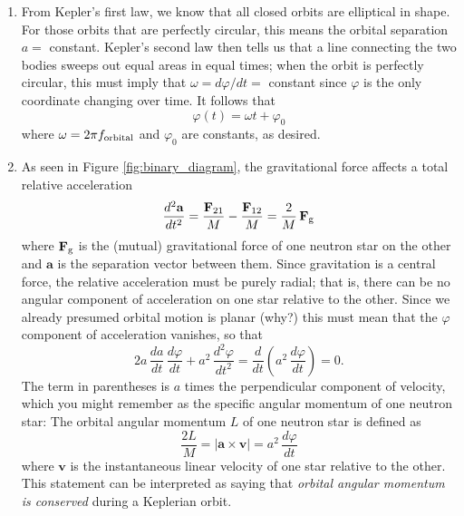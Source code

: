 \documentclass[11pt]{article}
\begin{document}
\begin{enumerate}

\item From Kepler's first law, we know that all closed orbits are elliptical in shape. For those orbits that are perfectly circular, this means the orbital separation $a =$ constant. Kepler's second law then tells us that a line connecting the two bodies sweeps out equal areas in equal times; when the orbit is perfectly circular, this must imply that $\omega = d\varphi/dt =$ constant since $\varphi$ is the only coordinate changing over time. It follows that
\begin{equation}
\varphi(t) = \omega t + \varphi_0
\end{equation}
where $\omega = 2\pi f_{\rm orbital}$ and $\varphi_0$ are constants, as desired.

\item As seen in Figure \ref{fig:binary_diagram}, the gravitational force affects a total relative acceleration \[ \frac{d^2\mathbf{a}}{dt^2} = \frac{\mathbf{F}_{\rm 21}}{M} - \frac{\mathbf{F}_{\rm 12}}{M} = \frac{2}{M}\,\mathbf{F}_{\rm g} \] where $\mathbf{F}_{\rm g}$ is the (mutual) gravitational force of one neutron star on the other and $\mathbf{a}$ is the separation vector between them. Since gravitation is a central force, the relative acceleration must be purely radial; that is, there can be no angular component of acceleration on one star relative to the other. Since we already presumed orbital motion is planar (why?) this must mean that the $\varphi$ component of acceleration vanishes, so that \[ 2a\,\frac{da}{dt}\,\frac{d\varphi}{dt} + a^2\,\frac{d^2\varphi}{dt^2} = \frac{d}{dt} \left( a^2\,\frac{d\varphi}{dt} \right) = 0. \]
The term in parentheses is $a$ times the perpendicular component of velocity, which you might remember as the specific angular momentum of one neutron star:
The orbital angular momentum $L$ of one neutron star is defined as
\begin{equation}
\frac{2L}{M} = \vert \mathbf{a} \times \mathbf{v} \vert = a^2\,\frac{d\varphi}{dt}
\end{equation}
where $\mathbf{v}$ is the instantaneous linear velocity of one star relative to the other. This statement can be interpreted as saying that \textit{orbital angular momentum is conserved} during a Keplerian orbit.


\end{enumerate}
\end{document}
